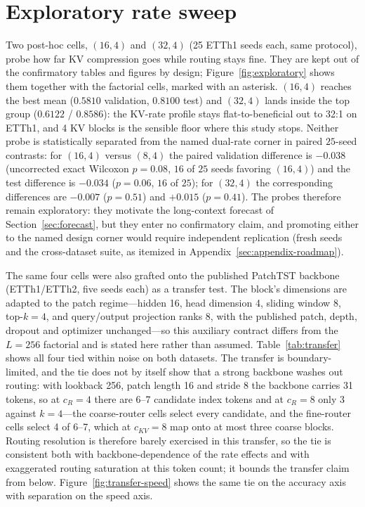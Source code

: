 \section{Exploratory rate sweep}
\label{sec:appendix-exploratory}
Two post-hoc cells, $(16,4)$ and $(32,4)$ (25 ETTh1 seeds each, same protocol),
probe how far KV compression goes while routing stays fine. They are kept out of the
confirmatory tables and figures by design; Figure~\ref{fig:exploratory} shows them
together with the factorial cells, marked with an asterisk. $(16,4)$ reaches the best mean
($0.5810$ validation, $0.8100$ test) and $(32,4)$ lands inside the top group ($0.6122$ /
$0.8586$): the KV-rate profile stays flat-to-beneficial out to 32:1 on ETTh1, and
4 KV blocks is the sensible floor where this study stops. Neither probe is
statistically separated from the named dual-rate corner in paired $25$-seed
contrasts: for $(16,4)$ versus $(8,4)$ the paired validation difference is
$-0.038$ (uncorrected exact Wilcoxon $p = 0.08$, $16$ of $25$ seeds favoring
$(16,4)$) and the test difference is $-0.034$ ($p = 0.06$, $16$ of $25$); for
$(32,4)$ the corresponding differences are $-0.007$ ($p = 0.51$) and $+0.015$
($p = 0.41$). The probes therefore remain exploratory: they motivate the
long-context forecast of Section~\ref{sec:forecast}, but they enter no
confirmatory claim, and promoting either to the named design corner would
require independent replication (fresh seeds and the cross-dataset suite,
as itemized in Appendix~\ref{sec:appendix-roadmap}).

The same four cells were also grafted onto the published PatchTST backbone
(ETTh1/ETTh2, five seeds each) as a transfer test. The block's dimensions are
adapted to the patch regime---hidden 16, head dimension 4, sliding window 8,
top-$k{=}4$, and query/output projection ranks 8, with the published patch, depth, dropout and
optimizer unchanged---so this auxiliary contract differs from the $L{=}256$
factorial and is stated here rather than assumed. Table~\ref{tab:transfer}
shows all four tied within noise on both datasets. The transfer is
boundary-limited, and the tie does not by itself show that a strong backbone
washes out routing: with lookback 256, patch length 16 and stride 8 the
backbone carries 31 tokens, so at $c_R{=}4$ there are 6--7 candidate index
tokens and at $c_R{=}8$ only 3 against $k{=}4$---the coarse-router cells
select every candidate, and the fine-router cells select 4 of 6--7, which at
$c_{KV}{=}8$ map onto at most three coarse blocks. Routing resolution is
therefore barely exercised in this transfer, so the tie is consistent both
with backbone-dependence of the rate effects and with exaggerated routing
saturation at this token count; it bounds the transfer claim from below.
Figure~\ref{fig:transfer-speed} shows the same tie on the accuracy axis with separation on the speed axis.

